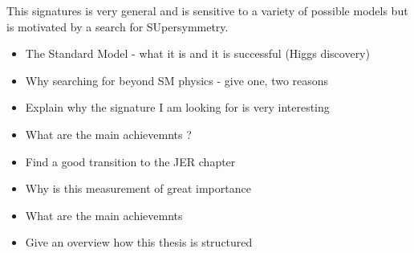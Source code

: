 This signatures is very general and is sensitive to a variety of possible models but is motivated by a search for SUpersymmetry.

\begin{itemize}
\item The Standard Model - what it is and it is successful (Higgs discovery)
\item Why searching for beyond SM physics -  give one, two reasons
\item Explain why the signature I am looking for is very interesting
\item What are the main achievemnts ?
\item Find a good transition to the JER chapter
\item Why is this measurement of great importance
\item What are the main achievemnts
\item Give an overview how this thesis is structured
\end{itemize}
